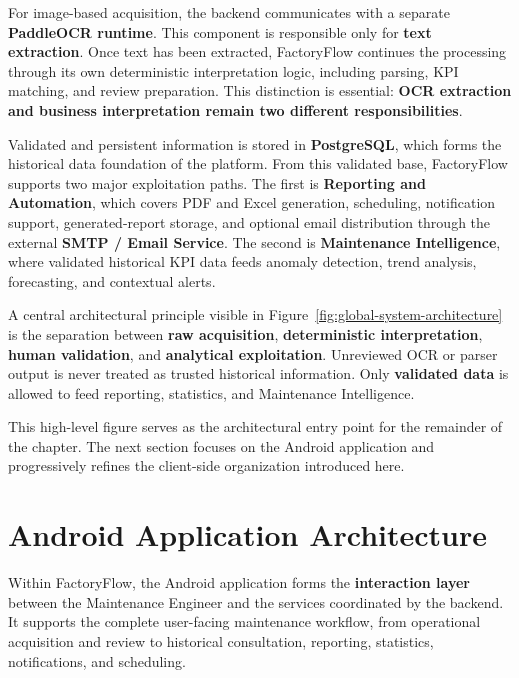 For image-based acquisition, the backend communicates with a separate \textbf{PaddleOCR runtime}. This component is responsible only for \textbf{text extraction}. Once text has been extracted, FactoryFlow continues the processing through its own deterministic interpretation logic, including parsing, KPI matching, and review preparation. This distinction is essential: \textbf{OCR extraction and business interpretation remain two different responsibilities}.

Validated and persistent information is stored in \textbf{PostgreSQL}, which forms the historical data foundation of the platform. From this validated base, FactoryFlow supports two major exploitation paths. The first is \textbf{Reporting and Automation}, which covers PDF and Excel generation, scheduling, notification support, generated-report storage, and optional email distribution through the external \textbf{SMTP / Email Service}. The second is \textbf{Maintenance Intelligence}, where validated historical KPI data feeds anomaly detection, trend analysis, forecasting, and contextual alerts.

A central architectural principle visible in Figure~\ref{fig:global-system-architecture} is the separation between \textbf{raw acquisition}, \textbf{deterministic interpretation}, \textbf{human validation}, and \textbf{analytical exploitation}. Unreviewed OCR or parser output is never treated as trusted historical information. Only \textbf{validated data} is allowed to feed reporting, statistics, and Maintenance Intelligence.

This high-level figure serves as the architectural entry point for the remainder of the chapter. The next section focuses on the Android application and progressively refines the client-side organization introduced here.



\section{Android Application Architecture}
\label{sec:android-application-architecture}

Within FactoryFlow, the Android application forms the \textbf{interaction layer} between the Maintenance Engineer and the services coordinated by the backend. It supports the complete user-facing maintenance workflow, from operational acquisition and review to historical consultation, reporting, statistics, notifications, and scheduling.


